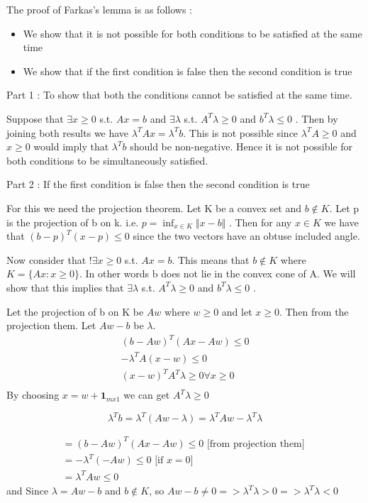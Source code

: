 \documentclass[12pt]{article}
\begin{document}
The proof of Farkas's lemma is as follows : 
\begin{itemize}
\item We show that it is not possible for both conditions to be satisfied at the same time
\item We show that if the first condition is false then the second condition is true
\end{itemize}


Part 1 : To show that both the conditions cannot be satisfied at the same time. 

Suppose that $\exists x \ge 0$ s.t. $Ax=b$ and $\exists \lambda$ s.t. $A^T\lambda \geq 0$ and $b^T\lambda \leq 0$ . Then by joining both results we have $\lambda^TAx = \lambda^Tb$. This is not possible since $\lambda^TA \geq 0$ and $x \geq 0$ would imply that $\lambda^Tb$ should be non-negative. Hence it is not possible for both conditions to be simultaneously satisfied. 

Part 2 : If the first condition is false then the second condition is true

For this we need the projection theorem. Let K be a convex set and $b \notin K$. Let p is the projection of b on k. i.e. $p = \inf_{x \in K}\Vert x - b \Vert$ . Then for any $x \in K$ we have that $(b-p)^T(x-p) \leq 0$ since the two vectors have an obtuse included angle. 

Now consider that $!\exists x \geq 0$ s.t. $Ax=b$. This means that $b \notin K $ where $K = \{ Ax : x \geq 0\}$. In other words b does not lie in the convex cone of A. We will show that this implies that $\exists \lambda$ s.t. $A^T\lambda \geq 0$ and $b^T\lambda \leq 0$ . 

Let the projection of b on K be $Aw$ where $w \geq 0$ and let $x \geq 0$. Then from the projection them. Let $Aw-b$ be $\lambda$. 
\begin{align*}
(b-Aw)^T(Ax-Aw) \leq 0  \\
-\lambda^TA(x-w) \leq 0 \\
(x-w)^TA^T\lambda \geq 0 \forall x \geq 0 \\
\end{align*}
By choosing $x = w + \textbf{1}_{mx1} $ we can get $A^T\lambda \geq 0$

\begin{equation}
\label{eq1}
\lambda^Tb = \lambda^T(Aw-\lambda) = \lambda^TAw - \lambda^T\lambda
\end{equation}

\begin{align*}
= (b-Aw)^T(Ax-Aw) \leq 0 \text{ [from projection them] }\\
= -\lambda^T(-Aw) \leq 0 \text{ [if $x=0$] } \\
= \lambda^T Aw \leq 0
\end{align*}
and
Since $\lambda =Aw-b$ and $b \notin K$, so $Aw-b \neq 0 => \lambda^T\lambda > 0 => \lambda^T\lambda  < 0$ 
\end{document}
